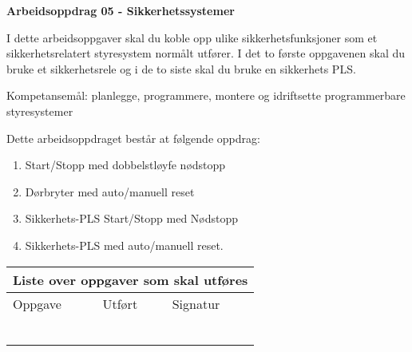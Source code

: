 
\noindent
{\bf Arbeidsoppdrag 05 - Sikkerhetssystemer}

\vskip 5pt

I dette arbeidsoppgaver skal du koble opp ulike sikkerhetsfunksjoner som et sikkerhetsrelatert styresystem normålt utfører. I det to første oppgavenen skal du bruke et sikkerhetsrele og i de to siste skal du bruke en sikkerhets PLS. 

Kompetansemål:
planlegge, programmere, montere og idriftsette programmerbare styresystemer

Dette arbeidsoppdraget består at følgende oppdrag:
\begin{enumerate}
	\item Start/Stopp med dobbelstløyfe nødstopp
	\item Dørbryter med auto/manuell reset
	\item Sikkerhets-PLS Start/Stopp med Nødstopp
	\item Sikkerhets-PLS med auto/manuell reset. 
\end{enumerate}

\begin{center}
\begin{tabular}{ | m{8cm} | m{1cm}| m{2cm} | } 
\hline
\multicolumn{3}{|c|}{Liste over oppgaver som skal utføres} \\
	\hline
	Oppgave	& Utført & Signatur \\ 
	\hline
	\hline
	& & \\ 
	\hline
	& & \\ 
	\hline
	& & \\ 
	\hline
	& & \\ 
	\hline
	& & \\ 
	\hline
	& & \\ 
	\hline
\end{tabular}
\end{center}


